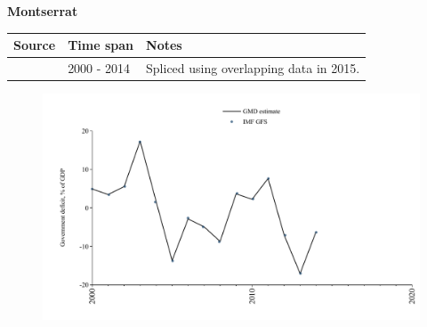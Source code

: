 \documentclass[12pt,a4paper,landscape]{article}
\begin{document}
\begin{adjustbox}{max totalsize={\paperwidth}{\paperheight},center}
\begin{minipage}[t][\textheight][t]{\textwidth}
\vspace*{0.5cm}
{}
\begin{center}
{\Large\bfseries Montserrat}
\end{center}
\vspace{0.5cm}
\begin{table}[H]
\centering
\small
\begin{tabular}{|l|l|l|}
\hline
\textbf{Source} & \textbf{Time span} & \textbf{Notes} \\
\hline
\rowcolor{white}\cite{IMF_GFS}& 2000 - 2014 &Spliced using overlapping data in 2015.\\
\hline
\end{tabular}
\end{table}
\begin{figure}[H]
\centering
\includegraphics[width=\textwidth,height=0.6\textheight,keepaspectratio]{graphs/MSR_govdef_GDP.pdf}
\end{figure}
\end{minipage}
\end{adjustbox}
\end{document}
